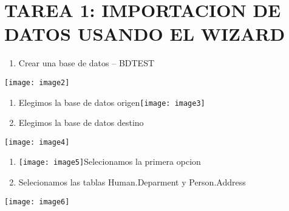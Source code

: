 \documentclass{article} %
\begin{document}
\noindent 

\noindent 

\noindent 

\noindent 

\noindent 

\noindent 

\noindent 

\noindent 

\noindent 

  

\noindent 

\noindent 

\noindent 

\noindent 

\noindent 

\noindent 
\section{TAREA 1: IMPORTACION DE DATOS USANDO EL WIZARD}

\noindent 

\begin{enumerate}
\item  Crear una base de datos -- BDTEST
\end{enumerate}

\noindent \texttt{[image: image2]}

\begin{enumerate}
\item    Elegimos la base de datos origen\texttt{[image: image3]}

\item  Elegimos la base de datos destino
\end{enumerate}

\noindent \texttt{[image: image4]}

\begin{enumerate}
\item  \texttt{[image: image5]}Selecionamos la primera opcion

\item  Selecionamos las tablas Human.Deparment y Person.Address
\end{enumerate}

\noindent \texttt{[image: image6]}
\end{document}
